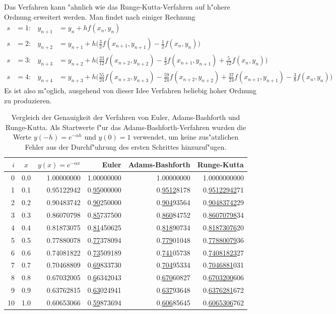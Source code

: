 Das Verfahren kann "ahnlich wie das Runge-Kutta-Verfahren auf h"ohere
Ordnung erweitert werden.
Man findet nach einiger Rechnung
\begin{align*}
s&=1\colon&
y_{n+1}
&=
y_n+hf(x_n,y_n)
\\
s&=2\colon&
y_{n+2}
&=
y_{n+1}+h\biggl(\frac32f(x_{n+1},y_{n+1})-\frac12f(x_n,y_n)\biggr)
\\
s&=3\colon&
y_{n+3}
&=
y_{n+2}+h\biggl(\frac{23}{12}f(x_{n+2},y_{n+2})-\frac43f(x_{n+1},y_{n+1})+\frac{5}{12}f(x_n,y_n)\biggr)
\\
s&=4\colon&
y_{n+4}
&=
y_{n+3}+h\biggl(\frac{55}{24}f(x_{n+3},y_{n+3})
	-\frac{59}{24}f(x_{n+2},y_{n+2})
	+\frac{37}{24}f(x_{n+1},y_{n+1})
	-\frac{3}{8}f(x_n,y_n)
\biggr)
\end{align*}
Es ist also m"oglich, ausgehend von dieser Idee Verfahren beliebig hoher
Ordnung zu produzieren.

\begin{table}
\centering
\begin{tabular}{|r|c|r|r|r|r|}
\hline
$i$& $x$ & $y(x)=e^{-\alpha x}$&Euler&Adams-Bashforth&Runge-Kutta\\
\hline
 0 & 0.0 & 1.00000000 & 1.00000000 & 1.00000000 & 1.0000000000 \\
 1 & 0.1 & 0.95122942 & 0.\underline{95}000000 & 0.\underline{9512}8178 & 0.\underline{95122942}71 \\
 2 & 0.2 & 0.90483742 & 0.\underline{90}250000 & 0.\underline{904}93564 & 0.\underline{90483742}29 \\
 3 & 0.3 & 0.86070798 & 0.\underline{85}737500 & 0.\underline{860}84752 & 0.\underline{86070798}34 \\
 4 & 0.4 & 0.81873075 & 0.\underline{81}450625 & 0.\underline{818}90734 & 0.\underline{81873076}20 \\
 5 & 0.5 & 0.77880078 & 0.\underline{77}378094 & 0.\underline{779}01048 & 0.\underline{77880079}36 \\
 6 & 0.6 & 0.74081822 & 0.\underline{73}509189 & 0.\underline{741}05738 & 0.\underline{74081823}27 \\
 7 & 0.7 & 0.70468809 & 0.\underline{69}833730 & 0.\underline{704}95334 & 0.\underline{7046881}031 \\
 8 & 0.8 & 0.67032005 & 0.\underline{6}6342043 & 0.\underline{670}60827 & 0.\underline{6703200}606 \\
 9 & 0.9 & 0.63762815 & 0.\underline{63}024941 & 0.\underline{637}93648 & 0.\underline{6376281}672 \\
10 & 1.0 & 0.60653066 & 0.\underline{59}873694 & 0.\underline{606}85645 & 0.\underline{6065306}762 \\
\hline
\end{tabular}
\caption{Vergleich der Genauigkeit der Verfahren von Euler,
Adams-Bashforth und Runge-Kutta.
Als Startwerte f"ur das Adams-Bashforth-Verfahren wurden die
Werte $y(-h)=e^{-\alpha h}$ und $y(0)=1$ verwendet, um keine zus"atzlichen
Fehler aus der Durchf"uhrung des ersten Schrittes hinzuzuf"ugen.
\label{numerik:genauigkeit-adams-bashforth}}
\end{table}

